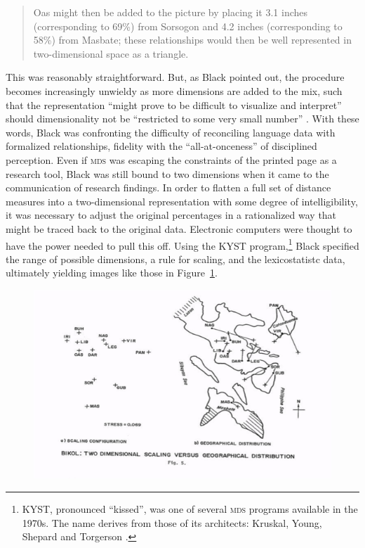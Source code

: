 \documentclass[output=paper]{langscibook}
\begin{document}
\begin{quotation}
Oas might then be added to the picture by placing it 3.1 inches (corresponding to 69\%) from Sorsogon and 4.2 inches (corresponding to 58\%) from Masbate; these relationships would then be well represented in two-dimensional space as a triangle. \citep[52]{Black1973}
\end{quotation}

This was reasonably straightforward. But, as Black pointed out, the procedure becomes increasingly unwieldy as more dimensions are added to the mix, such that the representation ``might prove to be difficult to visualize and interpret'' should dimensionality not be ``restricted to some very small number'' \citep[53]{Black1973}. With these words, Black was confronting the difficulty of reconciling language data with formalized relationships, fidelity with the ``all-at-onceness'' of disciplined perception. Even if \textsc{mds} was escaping the constraints of the printed page as a research tool, Black was still bound to two dimensions when it came to the communication of research findings. In order to flatten a full set of distance measures into a two-dimensional representation with some degree of intelligibility, it was necessary to adjust the original percentages in a rationalized way that might be traced back to the original data. Electronic computers were thought to have the power needed to pull this off. Using the KYST program,\footnote{KYST, pronounced ``kissed'', was one of several \textsc{mds} programs available in the 1970s. The name derives from those of its architects: Kruskal, Young, Shepard and Torgerson \citep[see][]{Kruskaletal1973}.} Black specified the range of possible dimensions, a rule for scaling, and the lexicostatistc data, ultimately yielding images like those in Figure~\ref{fig:kaplan:black1973}.

\begin{figure}
    \centering
    \includegraphics[scale=1]{figures/black1973.png}
    \caption{\citet{Black1973}}
    \label{fig:kaplan:black1973}
\end{figure}
\end{document}
